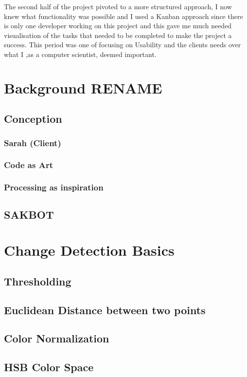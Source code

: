 \documentclass[a4paper]{report}
\begin{document}
The second half of the project pivoted to a more structured approach, I now knew what functionality was possible and I used a Kanban\cite{KANBAN} approach since there is only one developer working on this project and this gave me much needed visualisation of the tasks that needed to be completed to make the project a success. This period was one of focusing on Usability and the clients needs over what I ,as a computer scientist, deemed important.

\chapter{Background RENAME}
\section{Conception}
\subsection{Sarah (Client)}
\subsection{Code as Art}
\subsection{Processing as inspiration}
\section{SAKBOT}

\chapter{Change Detection Basics}
\section{Thresholding}
\section{Euclidean Distance between two points}
\section{Color Normalization}
\section{HSB Color Space}
\end{document}
